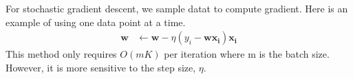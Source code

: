For stochastic gradient descent, we sample datat to compute gradient. Here is an example of using one data point at a time.
\begin{align*}
\boldsymbol{w} &\leftarrow \boldsymbol{w} - \eta (y_i - \boldsymbol{wx_i}) \boldsymbol{x_i}
\end{align*}
This method only requires $O(mK)$ per iteration where m is the batch size. However, it is more sensitive to the step size, $\eta$.




